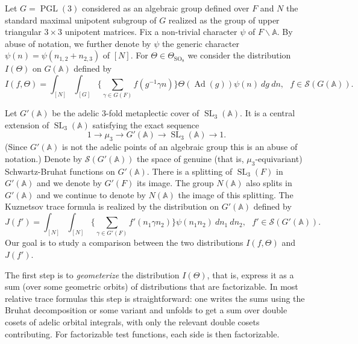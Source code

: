 \documentclass[12pt]{amsart}
\newcommand{\PGL}{\operatorname{PGL}}
\newcommand{\SL}{\operatorname{SL}}
\newcommand{\SO}{\operatorname{SO}}
\newcommand{\Ad}{\operatorname{Ad}}
\newcommand{\swrz}{\mathcal{S}}
\newcommand{\A}{\mathbb{A}}
\newcommand{\bs}{\backslash}
\theoremstyle{remark}
\begin{document}
Let $G=\PGL(3)$ considered as an algebraic group defined over $F$ and $N$ the standard maximal unipotent subgroup of $G$ realized as the 
group of upper triangular $3\times 3$ unipotent matrices.  Fix a non-trivial character $\psi$ of $F\bs \A$. 
By abuse of notation, we further denote by $\psi$ the generic character $\psi(n)=\psi(n_{1,2}+n_{2,3})$ of $[N]$.
For $\Theta\in \Theta_{\SO_8}$ we consider the distribution $I(\Theta)$ on $G(\A)$ defined by
\begin{equation}\label{PGL3-distribution}
I(f,\Theta)= \int_{{[N]}} \int_{[G]} \Big\{\sum_{\gamma\in G(F)} f(g^{-1}\gamma n) \Big\}\Theta(\Ad(g)) \psi(n) \ dg\ dn, \ \ \ f\in \swrz(G(\A)).
\end{equation}

Let $G'(\A)$ be the adelic $3$-fold metaplectic cover of $\SL_3(\A)$. It is a central extension of $\SL_3(\A)$
satisfying the exact sequence
\[
1\rightarrow \mu_3 \rightarrow G'(\A)\rightarrow \SL_3(\A)\rightarrow 1.
\] 
(Since $G'(\A)$ is not the adelic points of an algebraic group this is an abuse of notation.)
Denote by $\swrz(G'(\A))$ the space of genuine (that is, $\mu_3$-equivariant) Schwartz-Bruhat functions on $G'(\A)$.
There is a splitting of $\SL_3(F)$ in $G'(\A)$ and we denote by $G'(F)$ its image. 
The group $N(\A)$ also splits in $G'(\A)$ and we continue to denote by $N(\A)$ the image of this splitting. 
The Kuznetsov trace formula is realized by the distribution on $G'(\A)$ defined by
\begin{equation}\label{metaplectic-distribution}
J(f')=\int_{[N]}\int_{[N]} \Big\{\sum_{\gamma \in G'(F)} f'(n_1\gamma n_2)\Big\}\psi(n_1n_2)\ dn_1\ dn_2, \ \ \ f'\in \swrz(G'(\A)).
\end{equation}
Our goal is to study a comparison between the two distributions $I(f,\Theta)$ and $J(f')$. 

The first step is to \emph{geometerize} the distribution $I(\Theta)$, that is, express it as a sum (over some geometric orbits) of distributions that are factorizable. 
In most relative trace formulas this step is straightforward: one writes the sums using the Bruhat decomposition or some variant and unfolds to get a sum over double cosets of adelic 
orbital integrals, with only
the relevant double cosets contributing. For factorizable test functions, each side is then factorizable.
\end{document}
